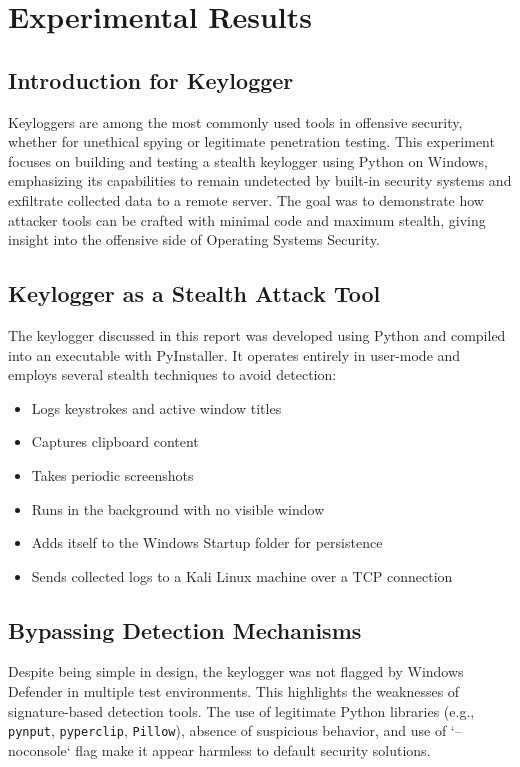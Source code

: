 \setcounter{secnumdepth}{-1}

\section{Experimental Results}

\subsection{Introduction for Keylogger}
Keyloggers are among the most commonly used tools in offensive security, whether for unethical spying or legitimate penetration testing. This experiment focuses on building and testing a stealth keylogger using Python on Windows, emphasizing its capabilities to remain undetected by built-in security systems and exfiltrate collected data to a remote server. The goal was to demonstrate how attacker tools can be crafted with minimal code and maximum stealth, giving insight into the offensive side of Operating Systems Security.

\subsection{Keylogger as a Stealth Attack Tool}
The keylogger discussed in this report was developed using Python and compiled into an executable with PyInstaller. It operates entirely in user-mode and employs several stealth techniques to avoid detection:
\begin{itemize}
    \item Logs keystrokes and active window titles
    \item Captures clipboard content
    \item Takes periodic screenshots
    \item Runs in the background with no visible window
    \item Adds itself to the Windows Startup folder for persistence
    \item Sends collected logs to a Kali Linux machine over a TCP connection
\end{itemize}

\subsection{Bypassing Detection Mechanisms}
Despite being simple in design, the keylogger was not flagged by Windows Defender in multiple test environments. This highlights the weaknesses of signature-based detection tools. The use of legitimate Python libraries (e.g., \texttt{pynput}, \texttt{pyperclip}, \texttt{Pillow}), absence of suspicious behavior, and use of `--noconsole` flag make it appear harmless to default security solutions.

